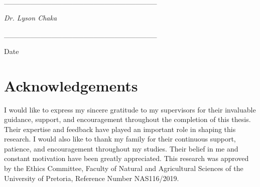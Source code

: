 \documentclass[english]{article}
\begin{document}
\_\_\_\_\_\_\_\_\_\_\_\_\_\_\_\_\_\_\_\_\_\_\_\_\_\_\_\_\_

\emph{Dr. Lyson Chaka}

\vspace{1cm}

\_\_\_\_\_\_\_\_\_\_\_\_\_\_\_\_\_\_\_\_\_\_\_\_\_\_\_\_\_

Date

\newpage{}

\section*{Acknowledgements}

I would like to express my sincere gratitude to my supervisors for their invaluable guidance, support, and encouragement throughout the completion of this thesis. Their expertise and feedback have played an important role in shaping this research. I would also like to thank my family for their continuous support, patience, and encouragement throughout my studies. Their belief in me and constant motivation have been greatly appreciated. This research was approved by the Ethics Committee, Faculty of Natural and Agricultural Sciences of the University of Pretoria, Reference Number NAS116/2019.

\newpage{}

\tableofcontents{}

\listoffigures

\listoftables

\newpage{}







\label{body-end}

\newpage
{}
{}



\newpage
\appendix

\end{document}

